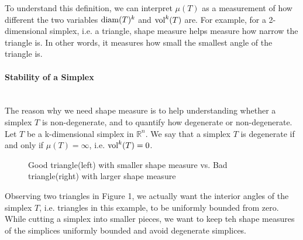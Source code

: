     To understand this definition, we can interpret $\mu(T)$ as a measurement of how different the two variables $\operatorname{diam}(T)^k$ and $\operatorname{vol}^k(T)$ are. For example, for a 2-dimensional simplex, i.e. a triangle, shape measure helps measure how narrow the triangle is. In other words, it measures how small the smallest angle of the triangle is.

    \paragraph{Stability of a Simplex}\mbox{}\\
    The reason why we need shape measure is to help understanding whether a simplex $T$ is non-degenerate, and to quantify how degenerate or non-degenerate. Let $T$ be a k-dimensional simplex in $\mathbb{R}^n$. We say that a simplex $T$ is degenerate if and only if $\mu(T) = \infty$, i.e. $\operatorname{vol}^k(T) = 0$. 

    
    \begin{figure}
    \centering
    \caption{Good triangle(left) with smaller shape measure vs. Bad triangle(right) with larger shape measure}
    \label{Fig1}
    \end{figure}

    Observing two triangles in Figure 1, we actually want the interior angles of the simplex $T$, i.e. triangles in this example, to be uniformly bounded from zero.
    While cutting a simplex into smaller pieces, we want to keep teh shape measures of the simplices uniformly bounded and avoid degenerate simplices. \\

